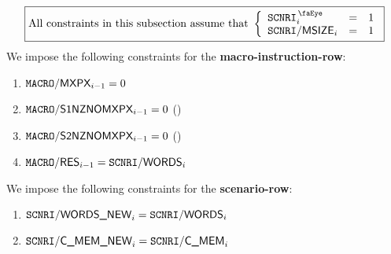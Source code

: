 

\[
	\boxed{\text{All constraints in this subsection assume that }
	\left\{ \begin{array}{lcl}
		\isMxpScenario    _{i} & = & 1 \\
		\mxpScenarioMsize _{i} & = & 1 \\
	\end{array} \right.}
\]
We impose the following constraints for the \textbf{macro-instruction-row}:
\begin{enumerate}
	\item $\texttt{MACRO}\textsf{/}{\textsf{MXPX}}_{i-1} = 0$
    \item $\texttt{MACRO}\textsf{/}{\textsf{S1NZNOMXPX}}_{i-1} = 0$ \quad (\sanityCheck)
    \item $\texttt{MACRO}\textsf{/}{\textsf{S2NZNOMXPX}}_{i-1} = 0$ \quad (\sanityCheck)
    \item $\texttt{MACRO}\textsf{/}{\textsf{RES}}_{i-1} = \texttt{SCNRI}\textsf{/}{\textsf{WORDS}}_{i}$
\end{enumerate}
We impose the following constraints for the \textbf{scenario-row}:

\begin{enumerate}
	\item $\texttt{SCNRI}\textsf{/}{\textsf{WORDS\_NEW}}_{i} = \texttt{SCNRI}\textsf{/}{\textsf{WORDS}}_{i}$
	\item $\texttt{SCNRI}\textsf{/}{\textsf{C\_MEM\_NEW}}_{i}  =  \texttt{SCNRI}\textsf{/}{\textsf{C\_MEM}}_{i}$
\end{enumerate}
